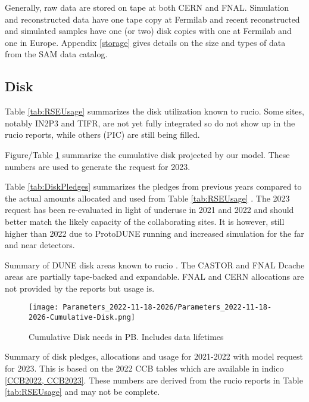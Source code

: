 \documentclass[12pt]{article}
\begin{document}
Generally, raw data are stored on tape at both CERN and FNAL.  Simulation and reconstructed data  have one tape copy at Fermilab and recent reconstructed and simulated samples have one (or two) disk copies with one at Fermilab and one in Europe.  Appendix \ref{storage} gives details on the size and types of data from the SAM data catalog.

\subsection{Disk}
Table \ref{tab:RSEUsage} summarizes the disk utilization known to rucio.  Some sites, notably IN2P3 and TIFR, are not yet fully integrated so do not show up in the rucio reports, while others (PIC) are still being filled.

Figure/Table  \ref{fig:Cumulative-Disk}  summarize the cumulative disk projected by our model. These numbers are used to generate the request for 2023. 

Table \ref{tab:DiskPledges} summarizes the pledges from previous years compared to the actual amounts allocated and used from Table \ref{tab:RSEUsage} .   The 2023 request has been re-evaluated in light of underuse in 2021 and 2022 and should better match the likely capacity of the collaborating sites.  It is however, still higher than 2022 due to ProtoDUNE running and increased simulation for the far and near detectors. 

\begin{table}[ht]
\centering{}
\caption{Summary  of DUNE disk areas known to rucio \cite{scotgrid}.  The CASTOR and FNAL Dcache areas are partially tape-backed and expandable. FNAL and CERN allocations are not provided by the reports but usage is.  }
\label{tab:RSEUsage}
\end{table}

\begin{figure}[h]
\centering\texttt{[image: Parameters\_2022-11-18-2026/Parameters\_2022-11-18-2026-Cumulative-Disk.png]}

\caption{Cumulative Disk needs in PB. Includes data lifetimes}\label{fig:Cumulative-Disk}
\end{figure}


\begin{table}[ht]
\centering{}
\caption{Summary of disk pledges, allocations and usage for 2021-2022 with model request for 2023.  This is based on the 2022 CCB tables which are available in indico  \ref{CCB2022, CCB2023}.  These numbers are derived from the rucio reports in Table \ref{tab:RSEUsage} and may not be complete. }
\label{tab:DiskPledges}
\end{table}
\end{document}
